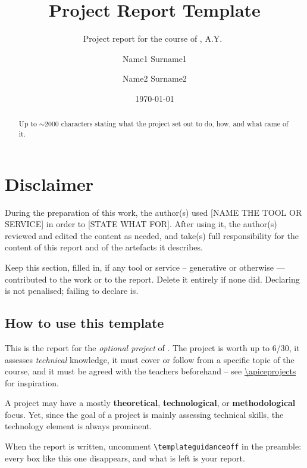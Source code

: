 \documentclass[11pt,a4paper]{scrartcl}
\title{\LARGE Project Report Template}
\subtitle{Project report for the course of \coursetitlelong{}, A.Y.\ \academicyear{}}
\author{ Name1 Surname1 \\ \emailaddr{name1.surname1@studio.unibo.it}
    \and Name2 Surname2 \\ \emailaddr{name2.surname2@studio.unibo.it}
}
\date{\today}
\begin{document}
\maketitle

\begin{abstract}
    Up to $\sim$2000 characters stating what the project set out to do, how, and what came of it.
\end{abstract}

\section*{Disclaimer}

During the preparation of this work, the author(s) used [NAME THE TOOL OR SERVICE] in order to [STATE WHAT FOR].
%
After using it, the author(s) reviewed and edited the content as needed, and take(s) full responsibility for the content of this report and of the artefacts it describes.

\begin{guidance}
Keep this section, filled in, if any tool or service – generative or otherwise — contributed to the work or to the report. 
%
Delete it entirely if none did. Declaring is not penalised; failing to declare is.
\end{guidance}

\begin{guidance}
\section*{How to use this template}

This is the report for the \emph{optional project} of \coursetitlelong{} \academicyear{}. 
%
The project is worth up to 6/30, it assesses \emph{technical} knowledge, it must cover or follow from a specific topic of the course, and it must be agreed with the teachers beforehand – see \url{\apiceprojects} for inspiration.

A project may have a mostly \textbf{theoretical}, \textbf{technological}, or \textbf{methodological} focus.
%
Yet, since the goal of a project is mainly assessing technical skills, the technology element is always prominent.

When the report is written, uncomment \texttt{\textbackslash templateguidanceoff} in the preamble: every box like this one disappears, and what is left is your report.
\end{guidance}
\end{document}
